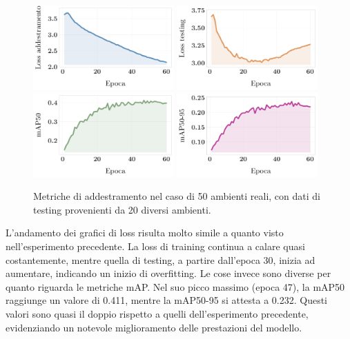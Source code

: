 \documentclass[12pt]{report}
\begin{document}
\begin{figure}[h!]
	\centering
	{\includegraphics[width=0.48\textwidth]{images/domain-shift/real-to-real/6/train-loss}}
	\hspace{0.01\textwidth}
	{\includegraphics[width=0.48\textwidth]{images/domain-shift/real-to-real/6/testing-loss}}
	\hspace{0.01\textwidth}
	\\
	{\includegraphics[width=0.48\textwidth]{images/domain-shift/real-to-real/6/map50}}
	\hspace{0.01\textwidth}
	{\includegraphics[width=0.48\textwidth]{images/domain-shift/real-to-real/6/map50-95}}
	\caption{Metriche di addestramento nel caso di 50 ambienti reali, con dati di testing provenienti da 20 diversi ambienti.}
	\label{fig:training-5}
\end{figure}

L'andamento dei grafici di loss risulta molto simile a quanto visto nell'esperimento precedente. La loss di training continua a calare quasi costantemente, mentre quella di testing, a partire dall'epoca 30, inizia ad aumentare, indicando un inizio di overfitting. Le cose invece sono diverse per quanto riguarda le metriche mAP. Nel suo picco massimo (epoca 47), la mAP50 raggiunge un valore di 0.411, mentre la mAP50-95 si attesta a 0.232. Questi valori sono quasi il doppio rispetto a quelli dell'esperimento precedente, evidenziando un notevole miglioramento delle prestazioni del modello.
\end{document}
